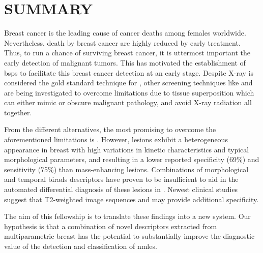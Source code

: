 \documentclass[a4paper,11pt]{article}
\begin{document}


\newpage
\setcounter{tocdepth}{1}
\setcounter{section}{-1}
\tableofcontents

\let\citeBk=\cite
\let\cite=\footcite


\newpage
\section{SUMMARY}
\label{sec:summary}

Breast cancer is the leading cause of cancer deaths among females worldwide.%
Nevertheless, death by breast cancer are highly reduced by early treatment.
Thus, to run a chance of surviving breast cancer, it is uttermost important the early detection of malignant tumors.
This has motivated the establishment of \acp{bsp} to facilitate this breast cancer detection at an early stage.
Despite X-ray \dm is considered the gold standard technique for \bsp, other screening techniques like \us and \mri are being investigated
to overcome \dm limitations due to tissue superposition which can either mimic or obscure malignant pathology,
and avoid X-ray radiation all together.

From the different \dm alternatives, the most promising to overcome the aforementioned limitations is \mri.
However, \nmle lesions exhibit a heterogeneous appearance in breast \mri with high variations in kinetic characteristics and typical morphological parameters, and resulting in a lower
reported specificity (69\%) and sensitivity (75\%) than mass-enhancing lesions.
Combinations of morphological and temporal \acs{birads} descriptors have proven to be insufficient to aid in the automated differential diagnosis of these lesions in \cemri.
Newest clinical studies suggest that T2-weighted image sequences and \dwi may provide additional specificity.

The aim of this fellowship is to translate these findings into a new \cad system.
Our hypothesis is that a combination of novel descriptors extracted from multiparametric breast \mri has the potential to substantially improve the diagnostic value of the detection and classification of \acp{nmle}.
\end{document}
